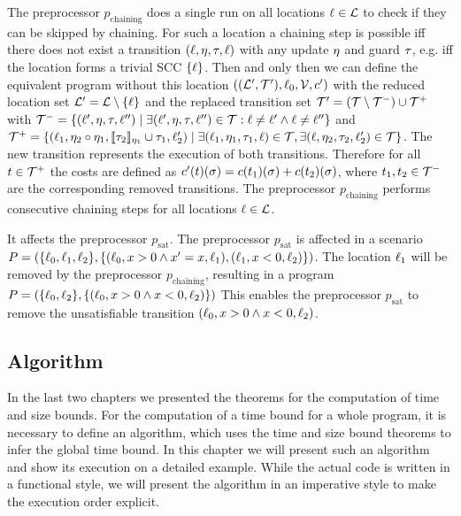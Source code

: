 The preprocessor $p_{\text{chaining}}$ does a single run on all locations $\ell \in \mathcal{L}$ to check if they can be skipped by chaining.
For such a location a chaining step is possible iff there does not exist a transition $(\ell,\eta,\tau,\ell)$ with any update $\eta$ and guard $\tau$, e.g. iff the location forms a trivial SCC $\lbrace \ell \rbrace$.
Then and only then we can define the equivalent program without this location $((\mathcal{L}', \mathcal{T}'), \ell_0, \mathcal{V}, c')$ with the reduced location set $\mathcal{L}' = \mathcal{L} \setminus \lbrace \ell \rbrace$ and the replaced transition set $\mathcal{T}' = (\mathcal{T} \setminus \mathcal{T}^-) \cup \mathcal{T}^+$ with $\mathcal{T}^- = \lbrace (\ell',\eta,\tau,\ell'') \mid \exists (\ell',\eta,\tau,\ell'') \in \mathcal{T}: \ell \neq \ell' \wedge \ell \neq \ell'' \rbrace$ and $\mathcal{T}^+ = \lbrace (\ell_1,\eta_2 \circ \eta_1,\llbracket \tau_2 \rrbracket_{\eta_1} \cup \tau_1,\ell_2') \mid \exists (\ell_1,\eta_1,\tau_1,\ell) \in \mathcal{T}, \exists (\ell,\eta_2,\tau_2,\ell_2') \in \mathcal{T} \rbrace$. 
The new transition represents the execution of both transitions.
Therefore for all $t \in \mathcal{T}^+$ the costs are defined as $c'(t)(\sigma) = c(t_1)(\sigma) + c(t_2)(\sigma)$, where $t_1, t_2 \in \mathcal{T}^-$ are the corresponding removed transitions.
The preprocessor $p_{\text{chaining}}$ performs consecutive chaining steps for all locations $\ell \in \mathcal{L}$.

It affects the preprocessor $p_{\text{sat}}$.
The preprocessor $p_{\text{sat}}$ is affected in a scenario $P = (\lbrace \ell_0, \ell_1, \ell_2 \rbrace, \lbrace (\ell_0,x>0 \wedge x'=x,\ell_1), (\ell_1,x<0,\ell_2) \rbrace)$.
The location $\ell_1$ will be removed by the preprocessor $p_{\text{chaining}}$, resulting in a program $P = (\lbrace \ell_0, \ell_2 \rbrace, \lbrace (\ell_0,x>0 \wedge x<0,\ell_2) \rbrace)$
This enables the preprocessor $p_{\text{sat}}$ to remove the unsatisfiable transition $(\ell_0,x>0 \wedge x<0,\ell_2)$.


\subsection{Algorithm}

In the last two chapters we presented the theorems for the computation of time and size bounds.
For the computation of a time bound for a whole program, it is necessary to define an algorithm, which uses the time and size bound theorems to infer the global time bound.
In this chapter we will present such an algorithm and show its execution on a detailed example.
While the actual code is written in a functional style, we will present the algorithm in an imperative style to make the execution order explicit.

